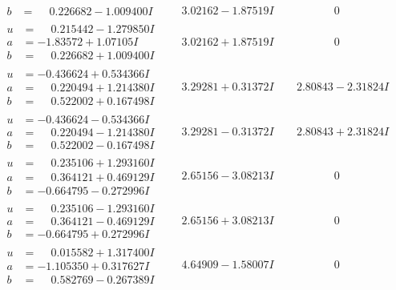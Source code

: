 \documentclass[1p]{elsarticle_modified}
\theoremstyle{definition}
\begin{document}
$$\begin{array}{c|c|c}
\begin{aligned}
b &= \phantom{-}0.226682 - 1.009400 I\end{aligned}
 & \phantom{-}3.02162 - 1.87519 I & \phantom{-0.000000 } 0 \\ \hline\begin{aligned}
u &= \phantom{-}0.215442 - 1.279850 I \\
a &= -1.83572 + 1.07105 I \\
b &= \phantom{-}0.226682 + 1.009400 I\end{aligned}
 & \phantom{-}3.02162 + 1.87519 I & \phantom{-0.000000 } 0 \\ \hline\begin{aligned}
u &= -0.436624 + 0.534366 I \\
a &= \phantom{-}0.220494 + 1.214380 I \\
b &= \phantom{-}0.522002 + 0.167498 I\end{aligned}
 & \phantom{-}3.29281 + 0.31372 I & \phantom{-}2.80843 - 2.31824 I \\ \hline\begin{aligned}
u &= -0.436624 - 0.534366 I \\
a &= \phantom{-}0.220494 - 1.214380 I \\
b &= \phantom{-}0.522002 - 0.167498 I\end{aligned}
 & \phantom{-}3.29281 - 0.31372 I & \phantom{-}2.80843 + 2.31824 I \\ \hline\begin{aligned}
u &= \phantom{-}0.235106 + 1.293160 I \\
a &= \phantom{-}0.364121 + 0.469129 I \\
b &= -0.664795 - 0.272996 I\end{aligned}
 & \phantom{-}2.65156 - 3.08213 I & \phantom{-0.000000 } 0 \\ \hline\begin{aligned}
u &= \phantom{-}0.235106 - 1.293160 I \\
a &= \phantom{-}0.364121 - 0.469129 I \\
b &= -0.664795 + 0.272996 I\end{aligned}
 & \phantom{-}2.65156 + 3.08213 I & \phantom{-0.000000 } 0 \\ \hline\begin{aligned}
u &= \phantom{-}0.015582 + 1.317400 I \\
a &= -1.105350 + 0.317627 I \\
b &= \phantom{-}0.582769 - 0.267389 I\end{aligned}
 & \phantom{-}4.64909 - 1.58007 I & \phantom{-0.000000 } 0 \\ \hline\begin{aligned}

\end{aligned}
\end{array}$$
\end{document}
